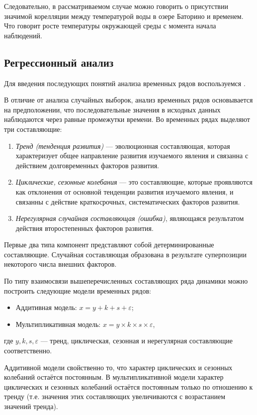 Следовательно, в рассматриваемом случае можно говорить о присутствии значимой корелляции между температурой воды в озере Баторино и временем. Что говорит росте температуры окружающей среды с момента начала наблюдений.


\subsection{Регрессионный анализ} %
\label{sec:regr_analysis}

Для введения последующих понятий анализа временных рядов воспользуемся \cite{Eddows1997}.

В отличие от анализа случайных выборок, анализ временных рядов основывается на предположении, что последовательные значения в исходных данных наблюдаются через равные промежутки времени. Во временных рядах выделяют три составляющие:
\begin{enumerate}
	\item \textit{Тренд (тенденция развития)} --- эволюционная составляющая, которая характеризует общее направление развития изучаемого явления и связанна с действием долговременных факторов развития.
	\item \textit{Циклические, сезонные колебания} --- это составляющие, которые проявляются как отклонения от основной тенденции развития изучаемого явления, и связанны с действие краткосрочных, систематических факторов развития.
	\item \textit{Нерегулярная случайная составляющая (ошибка)}, являющаяся результатом действия второстепенных факторов развития.
\end{enumerate}
Первые два типа компонент представляют собой детерминированные составляющие. Случайная составляющая образована в результате суперпозиции некоторого числа внешних факторов.

По типу взаимосвязи вышеперечисленных составляющих ряда динамики можно построить следующие модели временных рядов:
\begin{itemize}
	\item Аддитивная модель: $ x = y + k + s + \varepsilon $;
	\item Мультипликативная модель: $x = y \times k \times s \times \varepsilon$,
\end{itemize}
где $y, k, s, \varepsilon$ --- тренд, циклическая, сезонная и нерегулярная составляющие соответственно.

Аддитивной модели свойственно то, что характер циклических и сезонных колебаний остаётся постоянным. В мультипликативной модели характер циклических и сезонных колебаний остаётся постоянным только по отношению к тренду (т.е. значения этих составляющих увеличиваются с возрастанием значений тренда).

